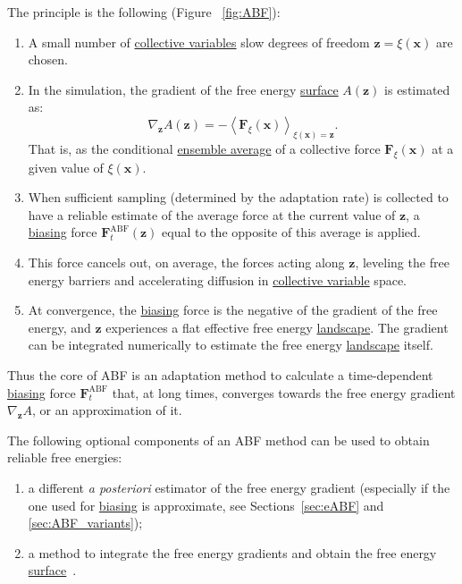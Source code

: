 \documentclass[9pt,review]{livecoms}
\newcommand{\vx}{\mathbf{x}}
\newcommand{\vz}{\mathbf{z}}
\newcommand{\vF}{\mathbf{F}}
\begin{document}
The principle is the following (Figure ~\ref{fig:ABF}):
\begin{enumerate}
 \item A small number of \hyperlink{ref:CV} {collective variables} slow degrees of freedom $\vz=\xi(\vx)$  are chosen.
 \item In the simulation, the gradient of the free energy \hyperlink{ref:FES} {surface} $A(\vz)$  is estimated as:
\begin{equation}
    \nabla_\vz A(\vz) = - \left\langle \vF_\xi(\vx)  \right\rangle_{\xi(\vx) = \vz}.
\end{equation}
That is, as the conditional \hyperlink{ref:ensemble_average} {ensemble average} of a collective force $\vF_\xi(\vx)$ at a given value of $\xi(\vx)$.
 \item When sufficient sampling (determined by the adaptation rate) is collected to have a reliable estimate of the average force at the current value of $\vz$, a \hyperlink{ref:biasingE} {biasing} force $\vF^\mathrm{ABF}_t(\vz)$ equal to the opposite of this average is applied.
 \item This force cancels out, on average, the forces acting along $\vz$, leveling the free energy barriers and accelerating diffusion in \hyperlink{ref:CV} {collective variable} space.
 \item At convergence, the \hyperlink{ref:biasingE} {biasing} force is the negative of the gradient of the free energy, and $\vz$ experiences a flat effective free energy \hyperlink{ref:FES} {landscape}. The gradient can be integrated numerically to estimate the free energy \hyperlink{ref:FES} {landscape} itself.
\end{enumerate}

Thus the core of ABF is an adaptation method to calculate a time-dependent \hyperlink{ref:biasingE} {biasing} force $\vF^\mathrm{ABF}_t$ that, at long times, converges towards the free energy gradient $\nabla_\vz A$, or an approximation of it.

The following optional components of an ABF method can be used to obtain reliable free energies:
\begin{enumerate}
\item a different \textit{a posteriori} estimator of the free energy gradient (especially if the one used for \hyperlink{ref:biasingE} {biasing} is approximate, see Sections~\ref{sec:eABF} and \ref{sec:ABF_variants});
\item a method to integrate the free energy gradients and obtain the free energy \hyperlink{ref:FES} {surface}~\cite{Henin2021integration}.
\end{enumerate}
\end{document}
